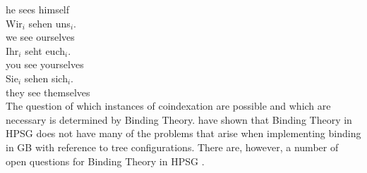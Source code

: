      he sees himself\\
\ex 
\gll Wir$_i$ sehen uns$_i$.\\
     we      see   ourselves\\
\ex 
\gll Ihr$_i$ seht euch$_i$.\\
     you see yourselves\\
\ex 
\gll Sie$_i$ sehen sich$_i$.\\
     they see themselves\\
\zl
The question of which instances of coindexation are possible and which are necessary is determined by Binding Theory.
\citet{PS92,ps2} have shown that Binding Theory in HPSG does not have many of the problems that arise when implementing binding in GB
with reference to tree configurations. There are, however, a number of open questions for Binding Theory in HPSG \citep[Section~20.4]{Mueller99a}.

